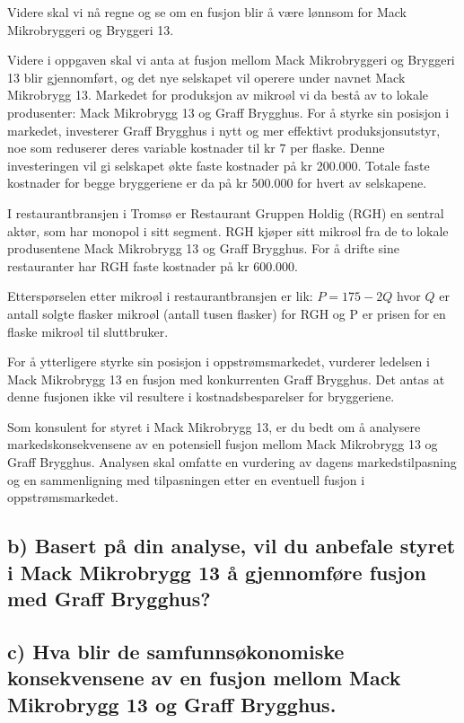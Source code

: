 \documentclass[
  12pt,
  a4paper,
  DIV=11,
  numbers=noendperiod]{scrartcl}
\begin{document}
Videre skal vi nå regne og se om en fusjon blir å være lønnsom for Mack
Mikrobryggeri og Bryggeri 13.

Videre i oppgaven skal vi anta at fusjon mellom Mack Mikrobryggeri og
Bryggeri 13 blir gjennomført, og det nye selskapet vil operere under
navnet Mack Mikrobrygg 13. Markedet for produksjon av mikroøl vi da
bestå av to lokale produsenter: Mack Mikrobrygg 13 og Graff Brygghus.
For å styrke sin posisjon i markedet, investerer Graff Brygghus i nytt
og mer effektivt produksjonsutstyr, noe som reduserer deres variable
kostnader til kr 7 per flaske. Denne investeringen vil gi selskapet økte
faste kostnader på kr 200.000. Totale faste kostnader for begge
bryggeriene er da på kr 500.000 for hvert av selskapene.

I restaurantbransjen i Tromsø er Restaurant Gruppen Holdig (RGH) en
sentral aktør, som har monopol i sitt segment. RGH kjøper sitt mikroøl
fra de to lokale produsentene Mack Mikrobrygg 13 og Graff Brygghus. For
å drifte sine restauranter har RGH faste kostnader på kr 600.000.

Etterspørselen etter mikroøl i restaurantbransjen er lik:
\(P = 175 − 2Q\) hvor \(Q\) er antall solgte flasker mikroøl (antall
tusen flasker) for RGH og P er prisen for en flaske mikroøl til
sluttbruker.

For å ytterligere styrke sin posisjon i oppstrømsmarkedet, vurderer
ledelsen i Mack Mikrobrygg 13 en fusjon med konkurrenten Graff Brygghus.
Det antas at denne fusjonen ikke vil resultere i kostnadsbesparelser for
bryggeriene.

Som konsulent for styret i Mack Mikrobrygg 13, er du bedt om å analysere
markedskonsekvensene av en potensiell fusjon mellom Mack Mikrobrygg 13
og Graff Brygghus. Analysen skal omfatte en vurdering av dagens
markedstilpasning og en sammenligning med tilpasningen etter en
eventuell fusjon i oppstrømsmarkedet.

\subsection{b) Basert på din analyse, vil du anbefale styret i Mack
Mikrobrygg 13 å gjennomføre fusjon med Graff
Brygghus?}\label{b-basert-puxe5-din-analyse-vil-du-anbefale-styret-i-mack-mikrobrygg-13-uxe5-gjennomfuxf8re-fusjon-med-graff-brygghus}

\subsection{c) Hva blir de samfunnsøkonomiske konsekvensene av en fusjon
mellom Mack Mikrobrygg 13 og Graff
Brygghus.}\label{c-hva-blir-de-samfunnsuxf8konomiske-konsekvensene-av-en-fusjon-mellom-mack-mikrobrygg-13-og-graff-brygghus.}
\end{document}
